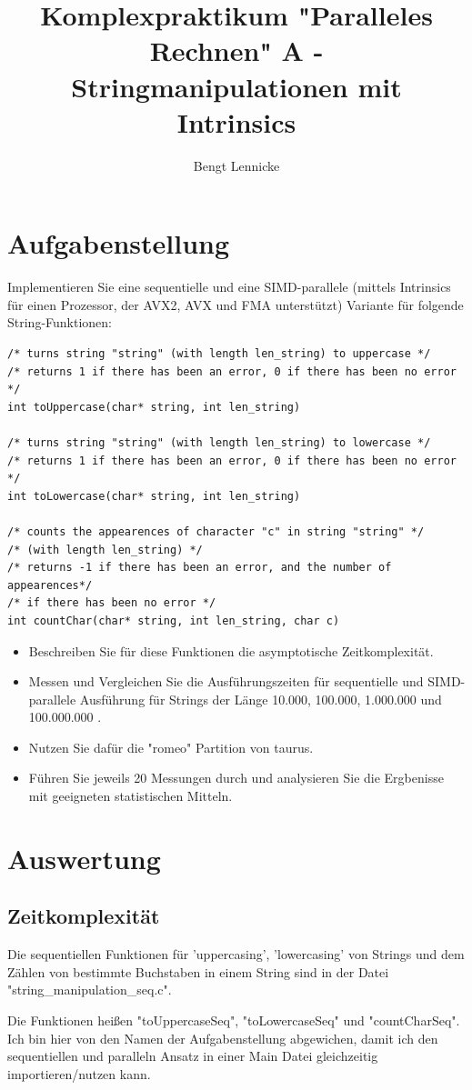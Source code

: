\documentclass[plainarticle,zihtitle,german,final,hyperref,utf8]{zihpub}
\author{Bengt Lennicke}
\title{Komplexpraktikum "Paralleles Rechnen" \newline A - Stringmanipulationen mit Intrinsics}
\begin{document}
\section{Aufgabenstellung}

Implementieren Sie eine sequentielle und eine SIMD-parallele (mittels Intrinsics für einen Prozessor, der AVX2, AVX und FMA unterstützt) Variante für folgende String-Funktionen:
\begin{verbatim}
/* turns string "string" (with length len_string) to uppercase */
/* returns 1 if there has been an error, 0 if there has been no error */
int toUppercase(char* string, int len_string)

/* turns string "string" (with length len_string) to lowercase */
/* returns 1 if there has been an error, 0 if there has been no error */
int toLowercase(char* string, int len_string)

/* counts the appearences of character "c" in string "string" */
/* (with length len_string) */
/* returns -1 if there has been an error, and the number of appearences*/
/* if there has been no error */
int countChar(char* string, int len_string, char c)
\end{verbatim}
\begin{itemize}
	\item Beschreiben Sie für diese Funktionen die asymptotische Zeitkomplexität.
	\item Messen und Vergleichen Sie die Ausführungszeiten für sequentielle und SIMD-parallele Ausführung für Strings der Länge 10.000, 100.000, 1.000.000 und 100.000.000 .
	\item Nutzen Sie dafür die "romeo" Partition von taurus.
	\item Führen Sie jeweils 20 Messungen durch und analysieren Sie die Ergbenisse mit geeigneten statistischen Mitteln.
	
\end{itemize}

\section{Auswertung}
\subsection{Zeitkomplexität}
Die sequentiellen Funktionen für 'uppercasing', 'lowercasing' von Strings und dem Zählen von bestimmte Buchstaben in einem String sind in der Datei "string\_manipulation\_seq.c".

Die Funktionen heißen "toUppercaseSeq", "toLowercaseSeq" und "countCharSeq". Ich bin hier von den Namen der Aufgabenstellung abgewichen, damit ich den sequentiellen und paralleln Ansatz in einer Main Datei gleichzeitig importieren/nutzen kann.
\end{document}
